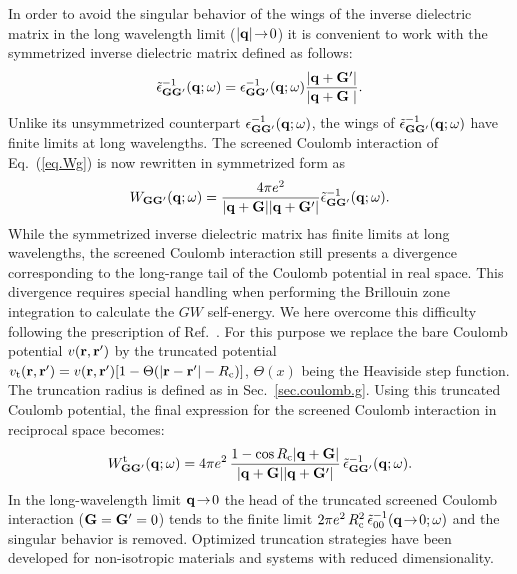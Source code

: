 \documentclass[twocolumn,prb,showpacs,superscriptaddress]{revtex4}
\def\w{\omega}
\def\q{{\bf q}}
\def\G{{\bf G}}
\def\Gp{{\bf G^\prime}}
\def\r{{\bf r}}
\def\rp{{\bf r^\prime}}
\begin{document}
In order to avoid the singular behavior of the wings of the inverse dielectric matrix 
in the long wavelength limit ($|\q|\!\rightarrow\!0$) it is convenient to work with
the symmetrized inverse dielectric matrix defined as follows:\cite{balde_tosa}
  \begin{equation}
  \tilde\epsilon^{-1}_{\G\Gp}(\q;\w) = \epsilon^{-1}_{\G\Gp}(\q;\w)  \frac{|\q+\Gp|}{|\q+\G\phantom{^\prime}|}.
  \end{equation}
Unlike its unsymmetrized counterpart $\epsilon^{-1}_{\G\Gp}(\q;\w)$,
the wings of $\tilde\epsilon^{-1}_{\G\Gp}(\q;\w)$ have finite limits 
at long wavelengths.
%
The screened Coulomb interaction of Eq.\ (\ref{eq.Wg}) is now rewritten in symmetrized form
as
  \begin{equation}\label{eq.Wg_symm}
  W_{\G\Gp}(\q;\w) = \frac{4\pi e^2}{|\q+\G||\q+\Gp|}  \tilde\epsilon^{-1}_{\G\Gp}(\q;\w).
  \end{equation}
While the symmetrized inverse dielectric matrix has finite limits at long wavelengths,
the screened Coulomb interaction still presents a divergence corresponding to the
long-range tail of the Coulomb potential in real space. This divergence requires special
handling when performing the Brillouin zone integration to calculate 
the $GW$ self-energy.\cite{hl86}
We here overcome this difficulty following the prescription of
Ref.~. For this purpose we replace
the bare Coulomb potential $v(\r,\rp)$ by the truncated potential 
$v_{\rm t}(\r,\rp)=v(\r,\rp)[1-\Theta(|\r-\rp|-R_{\rm c})]$, 
$\Theta(x)$ being the Heaviside step function.
The truncation radius is defined as in Sec.\ \ref{sec.coulomb.g}. 
Using this truncated Coulomb potential, the final expression for the screened 
Coulomb interaction in reciprocal space becomes:
  \begin{equation}\label{eq.Wg_symm}
  W^{\rm t}_{\G\Gp}(\q;\w) = 4\pi e^2 \, \frac{1-\cos{R_{\rm c}|\q+\G|}}{|\q+\G||\q+\Gp|}\,
     \tilde\epsilon^{-1}_{\G\Gp}(\q;\w).
  \end{equation}
In the long-wavelength limit $\q\!\rightarrow\!0$ the head 
of the truncated screened Coulomb interaction ($\G=\Gp=0$) tends to
the finite limit 
$2\pi e^2 \, R_{\rm c}^2 \, \tilde\epsilon^{-1}_{00}(\q\!\rightarrow\!0;\w)$
and the singular behavior is removed.
Optimized truncation strategies have been developed for non-isotropic materials
and systems with reduced dimensionality.\cite{sohrab}
\end{document}
